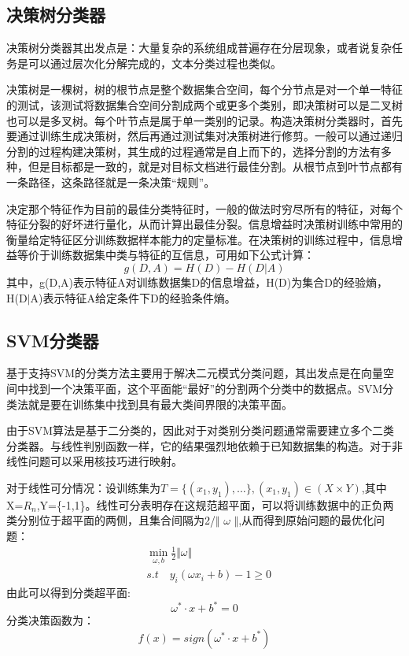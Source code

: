 \documentclass[UTF8]{ctexart}
\begin{document}
\subsection{决策树分类器}
	决策树分类器其出发点是：大量复杂的系统组成普遍存在分层现象，或者说复杂任务是可以通过层次化分解完成的，文本分类过程也类似。
	\par 决策树是一棵树，树的根节点是整个数据集合空间，每个分节点是对一个单一特征的测试，该测试将数据集合空间分割成两个或更多个类别，即决策树可以是二叉树也可以是多叉树。每个叶节点是属于单一类别的记录。构造决策树分类器时，首先要通过训练生成决策树，然后再通过测试集对决策树进行修剪。一般可以通过递归分割的过程构建决策树，其生成的过程通常是自上而下的，选择分割的方法有多种，但是目标都是一致的，就是对目标文档进行最佳分割。从根节点到叶节点都有一条路径，这条路径就是一条决策“规则”。\par 决定那个特征作为目前的最佳分类特征时，一般的做法时穷尽所有的特征，对每个特征分裂的好坏进行量化，从而计算出最佳分裂。信息增益时决策树训练中常用的衡量给定特征区分训练数据样本能力的定量标准。在决策树的训练过程中，信息增益等价于训练数据集中类与特征的互信息，可用如下公式计算：
	\begin{displaymath}
		g(D,A)=H(D)-H(D \vert A)
	\end{displaymath}
	其中，g(D,A)表示特征A对训练数据集D的信息增益，H(D)为集合D的经验熵，H(D$\vert$A)表示特征A给定条件下D的经验条件熵。

\subsection{SVM分类器}
	基于支持SVM的分类方法主要用于解决二元模式分类问题，其出发点是在向量空间中找到一个决策平面，这个平面能“最好”的分割两个分类中的数据点。SVM分类法就是要在训练集中找到具有最大类间界限的决策平面。\par 由于SVM算法是基于二分类的，因此对于对类别分类问题通常需要建立多个二类分类器。与线性判别函数一样，它的结果强烈地依赖于已知数据集的构造。对于非线性问题可以采用核技巧进行映射。
	\par 对于线性可分情况：设训练集为$T=\{(x_1,y_1),\ldots \},(x_1,y_1)\in (X \times Y)$,其中X=$R_n$,Y=\{-1,1\}。线性可分表明存在这规范超平面，可以将训练数据中的正负两类分别位于超平面的两侧，且集合间隔为2/$\Vert$ $\omega$ $\Vert$,从而得到原始问题的最优化问题：
	\begin{align*}
		&\min_{\omega,b} \frac{1}{2}{\Vert \omega \Vert} \\
		&s.t\quad y_i(\omega{x_i}+b)-1\ge 0
	\end{align*}
	由此可以得到分类超平面:
	\begin{displaymath}
		\omega^* \cdot x + b^* = 0
	\end{displaymath}
	分类决策函数为：
	\begin{displaymath}
		f(x)=sign(\omega^* \cdot x + b^*)
	\end{displaymath}
\end{document}

